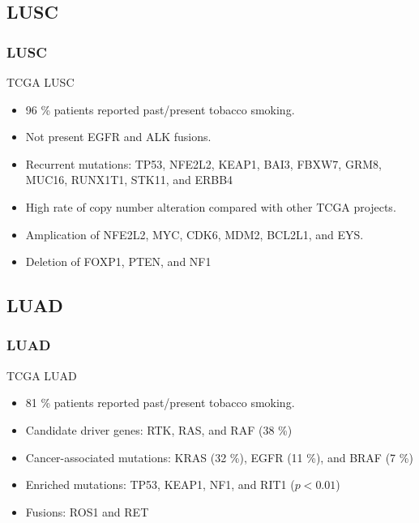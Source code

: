 \documentclass{beamer}
\begin{document}
    \subsection{LUSC}
    \begin{frame}
        \frametitle{LUSC}

        TCGA LUSC \cite{LUSC-1}
        \begin{itemize}
            \item 96 \% patients reported past/present tobacco smoking.
            \item Not present EGFR and ALK fusions.
            \item Recurrent mutations: TP53, NFE2L2, KEAP1, BAI3, FBXW7, GRM8, MUC16, RUNX1T1, STK11, and ERBB4
            \item High rate of copy number alteration compared with other TCGA projects.
            \item Amplication of NFE2L2, MYC, CDK6, MDM2, BCL2L1, and EYS.
            \item Deletion of FOXP1, PTEN, and NF1
        \end{itemize}
    \end{frame}

    \subsection{LUAD}
    \begin{frame}
        \frametitle{LUAD}

        TCGA LUAD \cite{LUAD-1}
        \begin{itemize}
            \item 81 \% patients reported past/present tobacco smoking.
            \item Candidate driver genes: RTK, RAS, and RAF (38 \%)
            \item Cancer-associated mutations: KRAS (32 \%), EGFR (11 \%), and BRAF (7 \%)
            \item Enriched mutations: TP53, KEAP1, NF1, and RIT1 ($p < 0.01$)
            \item Fusions: ROS1 and RET
        \end{itemize}
    \end{frame}
\end{document}
